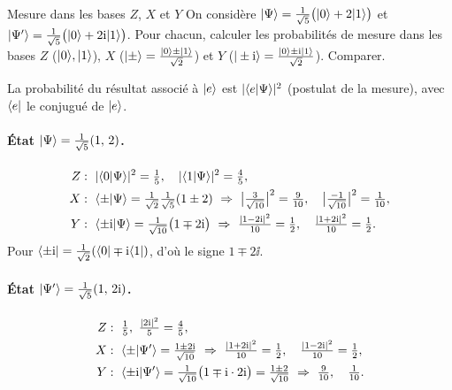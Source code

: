 \begin{exercice}{Mesure dans les bases $Z$, $X$ et $Y$}\label{ex:baseXY}
On considère $|\Psi\rangle=\frac{1}{\sqrt5}\big(|0\rangle+2|1\rangle\big)$ et
$|\Psi'\rangle=\frac{1}{\sqrt5}\big(|0\rangle+2\mathrm{i}|1\rangle\big)$. Pour chacun, calculer les probabilités
de mesure dans les bases $Z$ ($|0\rangle,|1\rangle$), $X$ ($|\pm\rangle=\frac{|0\rangle\pm|1\rangle}{\sqrt2}$)
et $Y$ ($|\pm\mathrm{i}\rangle=\frac{|0\rangle\pm\mathrm{i}|1\rangle}{\sqrt2}$). Comparer.
\end{exercice}
\begin{correction}
La probabilité du résultat associé à $|e\rangle$ est $|\langle e|\Psi\rangle|^2$ (postulat de la mesure),
avec $\langle e|$ le conjugué de $|e\rangle$.

\paragraph{État $|\Psi\rangle=\frac{1}{\sqrt5}(1,\,2)$.}
\begin{align*}
  Z&:\ |\braket{0}{\Psi}|^2=\tfrac15,\quad |\braket{1}{\Psi}|^2=\tfrac45,\\
  X&:\ \braket{\pm}{\Psi}=\tfrac{1}{\sqrt2}\tfrac{1}{\sqrt5}(1\pm2)
     \ \Rightarrow\ \big|\tfrac{3}{\sqrt{10}}\big|^2=\tfrac{9}{10},\quad\big|\tfrac{-1}{\sqrt{10}}\big|^2=\tfrac{1}{10},\\
  Y&:\ \braket{\pm\ii}{\Psi}=\tfrac{1}{\sqrt{10}}\big(1\mp2\ii\big)
     \ \Rightarrow\ \tfrac{|1-2\ii|^2}{10}=\tfrac12,\quad\tfrac{|1+2\ii|^2}{10}=\tfrac12 .
\end{align*}
Pour $\langle \pm\mathrm{i}|=\frac{1}{\sqrt2}(\langle 0|\mp\mathrm{i}\langle 1|)$, d'où le signe $1\mp2\ii$.

\paragraph{État $|\Psi'\rangle=\frac{1}{\sqrt5}(1,\,2\mathrm{i})$.}
\begin{align*}
  Z&:\ \tfrac15,\ \tfrac{|2\ii|^2}{5}=\tfrac45,\\
  X&:\ \braket{\pm}{\Psi'}=\tfrac{1\pm2\ii}{\sqrt{10}}
     \ \Rightarrow\ \tfrac{|1+2\ii|^2}{10}=\tfrac12,\quad\tfrac{|1-2\ii|^2}{10}=\tfrac12,\\
  Y&:\ \braket{\pm\ii}{\Psi'}=\tfrac{1}{\sqrt{10}}\big(1\mp\ii\cdot2\ii\big)=\tfrac{1\pm2}{\sqrt{10}}
     \ \Rightarrow\ \tfrac{9}{10},\quad\tfrac{1}{10}.
\end{align*}


\end{correction}
